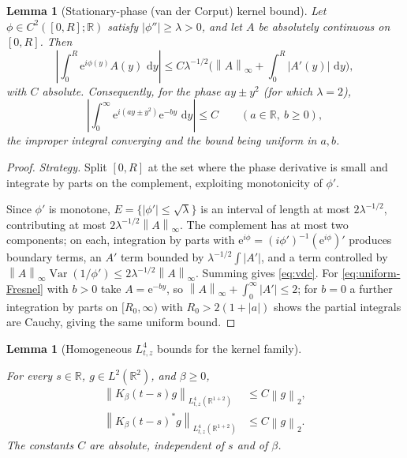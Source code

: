 \documentclass[11pt,oneside]{book}
\providecommand{\uses}[1]{}
\newtheorem{lemma}[theorem]{Lemma}
\theoremstyle{definition}
\theoremstyle{remark}
\newcommand{\R}{\mathbb R}
\newcommand{\1}{\mathbf 1}
\newcommand{\dd}{\,\mathrm d}
\newcommand{\norm}[1]{\left\lVert #1\right\rVert}
\newcommand{\e}{\mathrm e}
\begin{document}
\begin{lemma}[Stationary-phase (van der Corput) kernel bound]\label{lem:vandercorput-kernel}
Let $\phi\in C^2([0,R];\R)$ satisfy $|\phi''|\ge\lambda>0$, and let $A$ be absolutely
continuous on $[0,R]$. Then
\begin{equation}
 \left|\int_0^R\e^{i\phi(y)}A(y)\,\dd y\right|
 \le C\lambda^{-1/2}\Big(\norm A_\infty+\int_0^R|A'(y)|\,\dd y\Big), \label{eq:vdc}
\end{equation}
with $C$ absolute. Consequently, for the phase $ay\pm y^2$ (for which $\lambda=2$),
\begin{equation}
 \left|\int_0^\infty\e^{i(ay\pm y^2)}\e^{-by}\,\dd y\right|\le C
 \qquad(a\in\R,\ b\ge0), \label{eq:uniform-Fresnel}
\end{equation}
the improper integral converging and the bound being uniform in $a,b$.
\end{lemma}

\begin{proof}
\emph{Strategy.} Split $[0,R]$ at the set where the phase derivative is small and integrate
by parts on the complement, exploiting monotonicity of $\phi'$.

Since $\phi'$ is monotone, $E=\{|\phi'|\le\sqrt\lambda\}$ is an interval of length at most
$2\lambda^{-1/2}$, contributing at most $2\lambda^{-1/2}\norm A_\infty$. The complement has
at most two components; on each, integration by parts with
$\e^{i\phi}=(i\phi')^{-1}(\e^{i\phi})'$ produces boundary terms, an $A'$ term bounded by
$\lambda^{-1/2}\int|A'|$, and a term controlled by
$\norm A_\infty\operatorname{Var}(1/\phi')\le2\lambda^{-1/2}\norm A_\infty$. Summing gives
\eqref{eq:vdc}. For \eqref{eq:uniform-Fresnel} with $b>0$ take $A=\e^{-by}$, so
$\norm A_\infty+\int_0^\infty|A'|\le2$; for $b=0$ a further integration by parts on
$[R_0,\infty)$ with $R_0>2(1+|a|)$ shows the partial integrals are Cauchy, giving the same
uniform bound.
\end{proof}

\begin{lemma}[Homogeneous $L^4_{t,z}$ bounds for the kernel family]\label{lem:K-homogeneous}
\uses{def:conjugated-operator, def:scalar-mixed-norm}
For every $s\in\R$, $g\in L^2(\R^2)$, and $\beta\ge0$,
\begin{align}
 \norm{K_\beta(t-s)g}_{L^4_{t,z}(\R^{1+2})}   &\le C\norm g_2, \label{eq:K-homogeneous}\\
 \norm{K_\beta(t-s)^*g}_{L^4_{t,z}(\R^{1+2})} &\le C\norm g_2. \label{eq:K-adjoint-homogeneous}
\end{align}
The constants $C$ are absolute, independent of $s$ and of $\beta$.
\end{lemma}
\end{document}
